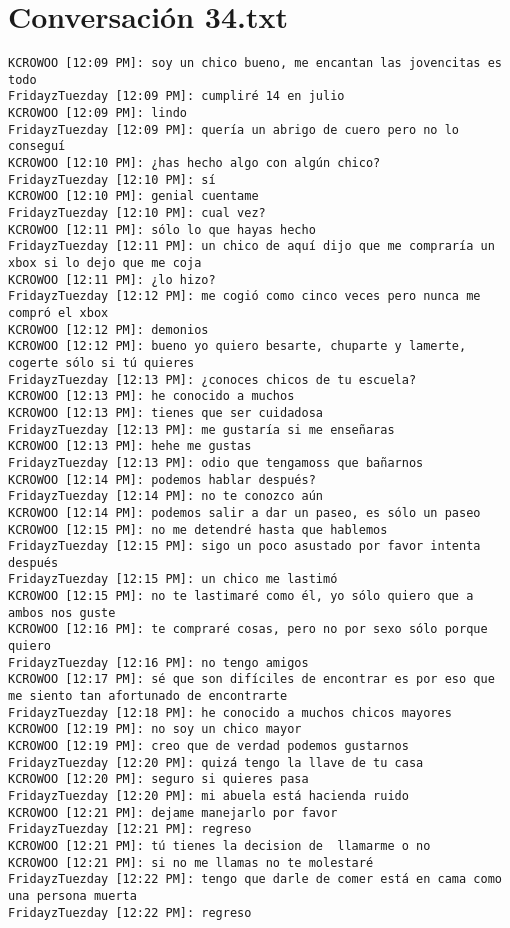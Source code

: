 \section{Conversaci\'on 34.txt}

\begin{verbatim}
KCROWOO [12:09 PM]: soy un chico bueno, me encantan las jovencitas es todo
FridayzTuezday [12:09 PM]: cumpliré 14 en julio
KCROWOO [12:09 PM]: lindo
FridayzTuezday [12:09 PM]: quería un abrigo de cuero pero no lo conseguí
KCROWOO [12:10 PM]: ¿has hecho algo con algún chico?
FridayzTuezday [12:10 PM]: sí
KCROWOO [12:10 PM]: genial cuentame
FridayzTuezday [12:10 PM]: cual vez?
KCROWOO [12:11 PM]: sólo lo que hayas hecho
FridayzTuezday [12:11 PM]: un chico de aquí dijo que me compraría un xbox si lo dejo que me coja
KCROWOO [12:11 PM]: ¿lo hizo?
FridayzTuezday [12:12 PM]: me cogió como cinco veces pero nunca me compró el xbox
KCROWOO [12:12 PM]: demonios
KCROWOO [12:12 PM]: bueno yo quiero besarte, chuparte y lamerte, cogerte sólo si tú quieres
FridayzTuezday [12:13 PM]: ¿conoces chicos de tu escuela?
KCROWOO [12:13 PM]: he conocido a muchos
KCROWOO [12:13 PM]: tienes que ser cuidadosa 
FridayzTuezday [12:13 PM]: me gustaría si me enseñaras
KCROWOO [12:13 PM]: hehe me gustas
FridayzTuezday [12:13 PM]: odio que tengamoss que bañarnos
KCROWOO [12:14 PM]: podemos hablar después?
FridayzTuezday [12:14 PM]: no te conozco aún
KCROWOO [12:14 PM]: podemos salir a dar un paseo, es sólo un paseo
KCROWOO [12:15 PM]: no me detendré hasta que hablemos
FridayzTuezday [12:15 PM]: sigo un poco asustado por favor intenta después
FridayzTuezday [12:15 PM]: un chico me lastimó
KCROWOO [12:15 PM]: no te lastimaré como él, yo sólo quiero que a ambos nos guste
KCROWOO [12:16 PM]: te compraré cosas, pero no por sexo sólo porque quiero
FridayzTuezday [12:16 PM]: no tengo amigos
KCROWOO [12:17 PM]: sé que son difíciles de encontrar es por eso que me siento tan afortunado de encontrarte
FridayzTuezday [12:18 PM]: he conocido a muchos chicos mayores
KCROWOO [12:19 PM]: no soy un chico mayor
KCROWOO [12:19 PM]: creo que de verdad podemos gustarnos
FridayzTuezday [12:20 PM]: quizá tengo la llave de tu casa
KCROWOO [12:20 PM]: seguro si quieres pasa
FridayzTuezday [12:20 PM]: mi abuela está hacienda ruido
KCROWOO [12:21 PM]: dejame manejarlo por favor
FridayzTuezday [12:21 PM]: regreso
KCROWOO [12:21 PM]: tú tienes la decision de  llamarme o no
KCROWOO [12:21 PM]: si no me llamas no te molestaré
FridayzTuezday [12:22 PM]: tengo que darle de comer está en cama como una persona muerta
FridayzTuezday [12:22 PM]: regreso 

\end{verbatim}
